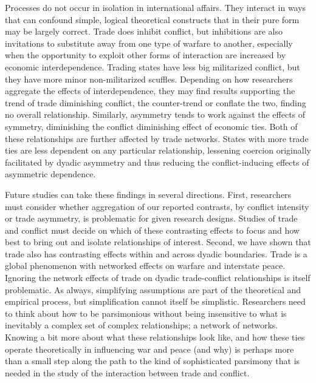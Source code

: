 \documentclass[12pt]{article}
\theoremstyle{hypothesis}
\begin{document}
Processes do not occur in isolation in international affairs. They interact in ways that can confound simple, logical theoretical constructs that in their pure form may be largely correct. Trade does inhibit conflict, but inhibitions are also invitations to substitute away from one type of warfare to another, especially when the opportunity to exploit other forms of interaction are increased by economic interdependence. Trading states have less big militarized conflict, but they have more minor non-militarized scuffles. Depending on how researchers aggregate the effects of interdependence, they may find results supporting the trend of trade diminishing conflict, the counter-trend or conflate the two, finding no overall relationship. Similarly, asymmetry tends to work against the effects of symmetry, diminishing the conflict diminishing effect of economic ties. Both of these relationships are further affected by trade networks. States with more trade ties are less dependent on any particular relationship, lessening coercion originally facilitated by dyadic asymmetry and thus reducing the conflict-inducing effects of asymmetric dependence.

Future studies can take these findings in several directions. First, researchers must consider whether aggregation of our reported contrasts, by conflict intensity or trade asymmetry, is problematic for given research designs. Studies of trade and conflict must decide on which of these contrasting effects to focus and how best to bring out and isolate relationships of interest. Second, we have shown that trade also has contrasting effects within and across dyadic boundaries. Trade is a global phenomenon with networked effects on warfare and interstate peace. Ignoring the network effects of trade on dyadic trade-conflict relationships is itself problematic. As always, simplifying assumptions are part of the theoretical and empirical process, but simplification cannot itself be simplistic. Researchers need to think about how to be parsimonious without being insensitive to what is inevitably a complex set of complex relationships; a network of networks. Knowing a bit more about what these relationships look like, and how these ties operate theoretically in influencing war and peace (and why) is perhaps more than a small step along the path to the kind of sophisticated parsimony that is needed in the study of the interaction between trade and conflict.

\newpage

%
%
%
\end{document}

